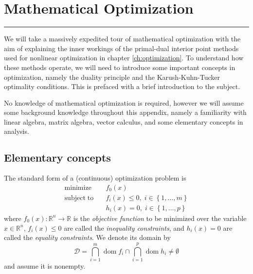 
\chapter{Mathematical Optimization}\label{appx:optimization}

\vspace{-1.5 em}
\begin{addmargin}[-0.5cm]{0cm}
  \minitoc
\end{addmargin}
\hrule
\vspace{1.5 em}

We will take a massively expedited tour of mathematical optimization with the aim of explaining the inner workings of the primal-dual interior point methods used for nonlinear optimization in chapter \ref{ch:optimization}. To understand how these methods operate, we will need to introduce some important concepts in optimization, namely the duality principle and the Karush-Kuhn-Tucker optimality conditions. This is prefaced with a brief introduction to the subject.

No knowledge of mathematical optimization is required, however we will assume some background knowledge throughout this appendix, namely a familiarity with linear algebra, matrix algebra, vector calculus, and some elementary concepts in analysis.

\section{Elementary concepts}
The standard form of a (continuous) optimization problem is
\begin{align} \label{eq:op}
  \mathrm{minimize}   \quad & f_0(x) \nonumber \\
  \mathrm{subject\;to} \quad &
    f_i(x) \leq 0, \; i \in \left\{1, \dots, m \right\}\\
    & h_i(x) = 0, \; i \in \left\{1, \dots, p \right\} \nonumber
\end{align}
where $f_0(x): \mathbb{R}^n \rightarrow \mathbb{R}$ is the \emph{objective function} to be minimized over the variable $x \in \mathbb{R}^n$, $f_i(x) \leq 0$ are called the \emph{inequality constraints}, and $h_i(x) = 0$ are called the \emph{equality constraints}. We denote its domain by
\begin{equation}
\mathcal{D} = \bigcap_{i=1}^m \operatorname{dom} f_i \cap \bigcap_{i=1}^p \operatorname{dom} h_i \neq \emptyset
\end{equation}
and assume it is nonempty.

